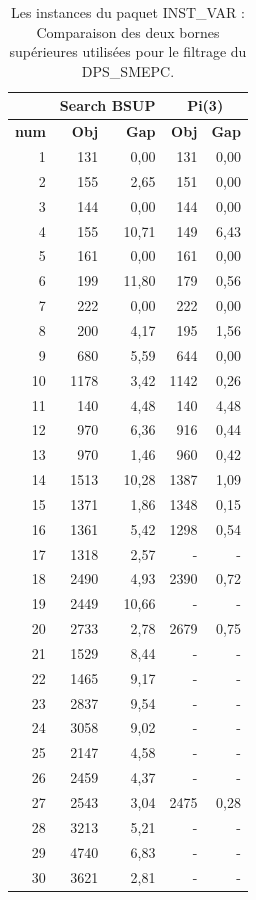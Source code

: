 \begin{table}[H]
	\centering
	\small
	\begin{tabular}{|r|rr|rr|}
		\toprule
		\hline
		\rowcolor{cyan}	& \multicolumn{2}{c|}{\textbf{ Search BSUP}}&\multicolumn{2}{c|}{\textbf{Pi(3)}} \\ \hline
		\midrule
		\rowcolor{cyan}	\textbf{num} & \textbf{Obj}& \textbf{Gap}  & \textbf{Obj}& \textbf{Gap}   \\ \hline
		\midrule
		
		1	&	131	&	0,00	&	131	&	0,00	\\ \hline
		2	&	155	&	2,65	&	151	&	0,00	\\ \hline
		3	&	144	&	0,00	&	144	&	0,00	\\ \hline
		4	&	155	&	10,71	&	149	&	6,43	\\ \hline
		5	&	161	&	0,00	&	161	&	0,00	\\ \hline
		6	&	199	&	11,80	&	179	&	0,56	\\ \hline
		7	&	222	&	0,00	&	222	&	0,00	\\ \hline
		8	&	200	&	4,17	&	195	&	1,56	\\ \hline
		9	&	680	&	5,59	&	644	&	0,00	\\ \hline
		10	&	1178	&	3,42	&	1142	&	0,26	\\ \hline
		11	&	140	&	4,48	&	140	&	4,48	\\ \hline
		12	&	970	&	6,36	&	916	&	0,44	\\ \hline
		13	&	970	&	1,46	&	960	&	0,42	\\ \hline
		14	&	1513	&	10,28	&	1387	&	1,09	\\ \hline
		15	&	1371	&	1,86	&	1348	&	0,15	\\ \hline
		16	&	1361	&	5,42	&	1298	&	0,54	\\ \hline
		17	&	1318	&	2,57	&	-	&	-	\\ \hline
		18	&	2490	&	4,93	&	2390	&	0,72	\\ \hline
		19	&	2449	&	10,66	&	-	&	-	\\ \hline
		20	&	2733	&	2,78	&	2679	&	0,75	\\ \hline
		21	&	1529	&	8,44	&	-	&	-	\\ \hline
		22	&	1465	&	9,17	&	-	&	-	\\ \hline
		23	&	2837	&	9,54	&	-	&	-	\\ \hline
		24	&	3058	&	9,02	&	-	&	-	\\ \hline
		25	&	2147	&	4,58	&	-	&	-	\\ \hline
		26	&	2459	&	4,37	&	-	&	-	\\ \hline
		27	&	2543	&	3,04	&	2475	&	0,28	\\ \hline
		28	&	3213	&	5,21	&	-	&	-	\\ \hline
		29	&	4740	&	6,83	&	-	&	-	\\ \hline
		30	&	3621	&	2,81	&	-	&	-	\\ \hline
		
		
		\bottomrule
	\end{tabular}%
	\caption{Les instances du paquet INST\_VAR : Comparaison des deux bornes supérieures utilisées pour le filtrage du DPS\_SMEPC.}
	
	\label{BSUP_avant_apres_B}%
\end{table}%

